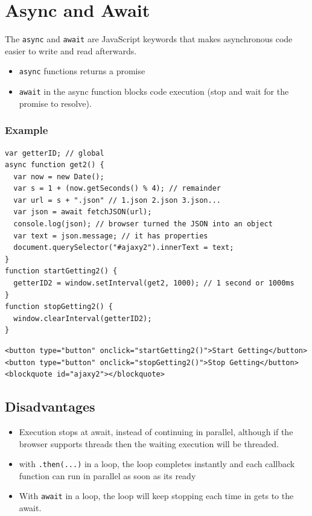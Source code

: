 \documentclass[../CMPUT-404-Notes.tex]{subfiles}
\begin{document}
\section{Async and Await}
The \texttt{async} and \texttt{await} are JavaScript keywords that makes asynchronous code easier to write and read afterwards.

\begin{itemize}
  \item \texttt{async} functions returns a promise
  \item \texttt{await} in the async function blocks code execution (stop and wait for the promise to resolve).
\end{itemize}

\subsubsection{Example}
\begin{verbatim}
var getterID; // global
async function get2() {
  var now = new Date();
  var s = 1 + (now.getSeconds() % 4); // remainder
  var url = s + ".json" // 1.json 2.json 3.json...
  var json = await fetchJSON(url);
  console.log(json); // browser turned the JSON into an object
  var text = json.message; // it has properties
  document.querySelector("#ajaxy2").innerText = text;
}
function startGetting2() {
  getterID2 = window.setInterval(get2, 1000); // 1 second or 1000ms
}
function stopGetting2() {
  window.clearInterval(getterID2);
}
\end{verbatim}

\begin{verbatim}
<button type="button" onclick="startGetting2()">Start Getting</button>
<button type="button" onclick="stopGetting2()">Stop Getting</button>
<blockquote id="ajaxy2"></blockquote>
\end{verbatim}

\subsection{Disadvantages}
\begin{itemize}
  \item Execution stops at await, instead of continuing in parallel, although if the browser supports threads then the waiting execution will be threaded.
  \item with \texttt{.then(...)} in a loop, the loop completes instantly and each callback function can run in parallel as soon as its ready
  \item With \texttt{await} in a loop, the loop will keep stopping each time in gets to the await. 
\end{itemize}
\end{document}
